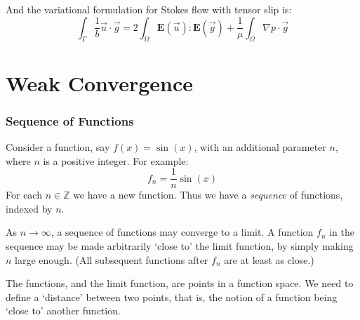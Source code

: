 \documentclass[a4paper]{report}
\begin{document}
\vspace*{1em}
And the variational formulation for Stokes flow with tensor slip is:
\begin{equation}
\int_{\Gamma} \frac{1}{b} \vec{u} \cdot \vec{g} = 
2 \int_{\Omega} \mathbf{E}(\vec{u}) : \mathbf{E}(\vec{g}) +
\frac{1}{\mu} \int_{\Omega}  \nabla p \cdot \vec{g}
\end{equation}


\section*{Weak Convergence}

\subsubsection*{Sequence of Functions}

Consider a function, say $f(x) = \sin(x)$, with an additional parameter $n$, where $n$ is a positive integer.  For example:
\begin{equation}
f_n = \frac{1}{n} \sin (x)
\end{equation}
For each $n \in \mathbb{Z}$ we have a new function.  Thus we have a \emph{sequence} of functions, indexed by $n$.

\begin{center}
\end{center}

As $n \rightarrow \infty$, a sequence of functions may converge to a limit. 
A function $f_n$ in the sequence may be made arbitrarily `close to' the limit function, by simply making $n$ large enough. (All subsequent functions after $f_n$ are at least as close.)

The functions, and the limit function, are points in a function space.  We need to define a `distance' between two points, that is, the notion of a function being `close to' another function.
\end{document}
